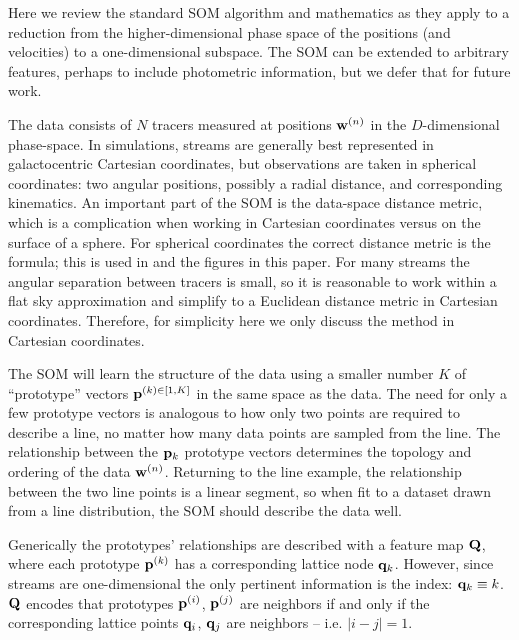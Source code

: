\documentclass[fleqn,usenatbib]{mnras}
\begin{document}
      Here we review the standard SOM algorithm and mathematics as they apply to
      a reduction from the higher-dimensional phase space of the positions (and
      velocities) to a one-dimensional subspace. The SOM can be extended to
      arbitrary features, perhaps to include photometric information, but we
      defer that for future work.

      The data consists of $N$ tracers measured at positions $\mathbf{w}^{(n)}$ in
      the $D$-dimensional phase-space. In simulations, streams are generally
      best represented in galactocentric Cartesian coordinates, but observations
      are taken in spherical coordinates: two angular positions, possibly a
      radial distance, and corresponding kinematics. An important part of the
      SOM is the data-space distance metric, which is a complication when
      working in Cartesian coordinates versus on the surface of a sphere. For
      spherical coordinates the correct distance metric is the
      \citet{Vincenty1975} formula; this is used in \trackstream{} and the
      figures in this paper. For many streams the angular separation between
      tracers is small, so it is reasonable to work within a flat sky
      approximation and simplify to a Euclidean distance metric in Cartesian
      coordinates. Therefore, for simplicity here we only discuss the method in
      Cartesian coordinates.

      The SOM will learn the structure of the data using a smaller number $K$ of
      ``prototype'' vectors $\mathbf{p}^{(k) \in [1, K]}$ in the same space as the
      data. The need for only a few prototype vectors is analogous to how only
      two points are required to describe a line, no matter how many data points
      are sampled from the line. The relationship between the $\mathbf{p}_{k}$
      prototype vectors determines the topology and ordering of the data
      $\mathbf{w}^{(n)}$. Returning to the line example, the relationship between
      the two line points is a linear segment, so when fit to a dataset drawn
      from a line distribution, the SOM should describe the data well. 

      Generically the prototypes' relationships are described with a feature map
      $\mathbf{Q}$, where each prototype $\mathbf{p}^{(k)}$ has a corresponding
      lattice node $\mathbf{q}_k$. However, since streams are one-dimensional the
      only pertinent information is the index: $\mathbf{q}_k \equiv k$. $\mathbf{Q}$
      encodes that prototypes $\mathbf{p}^{(i)}$, $\mathbf{p}^{(j)}$ are neighbors if
      and only if the corresponding lattice points $\mathbf{q}_i$, $\mathbf{q}_j$ are
      neighbors -- i.e. $|i-j| = 1$.
\end{document}
